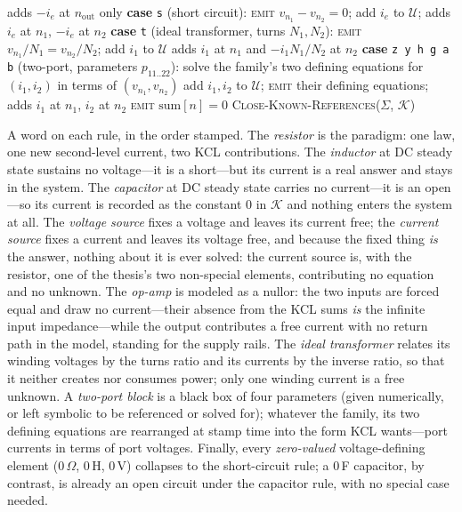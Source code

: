 \documentclass[11pt,oneside]{report}
\newcommand{\kw}[1]{\textsc{#1}}
\newcommand{\code}[1]{\texttt{#1}}
\newcommand{\CaseLine}[1]{\State \textbf{case} #1}
\begin{document}
\begin{algorithm}[p]
\begin{algorithmic}[1]
    \State adds $-i_e$ at $n_\mathrm{out}$ only
  \CaseLine{\code{s} (short circuit):}
    \State \kw{emit} $v_{n_1} - v_{n_2} = 0$;\quad
      add $i_e$ to $\mathcal{U}$;\quad
      adds $i_e$ at $n_1$, $-i_e$ at $n_2$
  \CaseLine{\code{t} (ideal transformer, turns $N_1, N_2$):}
    \State \kw{emit} $v_{n_1}/N_1 = v_{n_2}/N_2$;\quad
      add $i_1$ to $\mathcal{U}$
    \State adds $i_1$ at $n_1$ and $-i_1 N_1/N_2$ at $n_2$
  \CaseLine{\code{z y h g a b} (two-port, parameters $p_{11..22}$):}
    \State solve the family's two defining equations for
      $(i_1, i_2)$ in terms of $(v_{n_1}, v_{n_2})$
      \Comment{e.g.\ for \code{z}: invert the $2\times2$ matrix}
    \State add $i_1, i_2$ to $\mathcal{U}$; \kw{emit} their defining
      equations; adds $i_1$ at $n_1$, $i_2$ at $n_2$
  \EndSwitch
\EndFor
\ForAll{registered node $n \ne \code{0}$}
  \State \kw{emit} $\mathrm{sum}[n] = 0$
\EndFor
\State \kw{Close-Known-References}($\Sigma$, $\mathcal{K}$)
  \Comment{\S\ref{sec:closure}}
\end{algorithmic}
\end{algorithm}

A word on each rule, in the order stamped. The \emph{resistor} is the
paradigm: one law, one new second-level current, two KCL
contributions. The \emph{inductor} at DC steady state sustains no
voltage---it is a short---but its current is a real answer and stays
in the system. The \emph{capacitor} at DC steady state carries no
current---it is an open---so its current is recorded as the constant
$0$ in $\mathcal{K}$ and nothing enters the system at all. The
\emph{voltage source} fixes a voltage and leaves its current free; the
\emph{current source} fixes a current and leaves its voltage free, and
because the fixed thing \emph{is} the answer, nothing about it is ever
solved: the current source is, with the resistor, one of the thesis's
two non-special elements, contributing no equation and no unknown. The \emph{op-amp} is modeled as a nullor: the two inputs are
forced equal and draw no current---their absence from the KCL sums
\emph{is} the infinite input impedance---while the output contributes
a free current with no return path in the model, standing for the
supply rails. The \emph{ideal transformer} relates its winding
voltages by the turns ratio and its currents by the inverse ratio, so
that it neither creates nor consumes power; only one winding current
is a free unknown. A \emph{two-port block} is a black box of four
parameters (given numerically, or left symbolic to be referenced or
solved for); whatever the family, its two defining equations are
rearranged at stamp time into the form KCL wants---port currents in
terms of port voltages. Finally, every \emph{zero-valued}
voltage-defining element (0\,$\Omega$, 0\,H, 0\,V) collapses to the
short-circuit rule; a 0\,F capacitor, by contrast, is already an open
circuit under the capacitor rule, with no special case needed.
\end{document}
